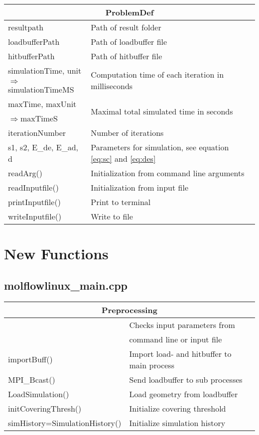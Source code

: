 \begin{center}
\begin{tabular}{|l|l|}
\hline
\multicolumn{2}{|c|}{\rule{0pt}{3ex}ProblemDef}\\
\hline
\rule{0pt}{3ex} resultpath& Path of result folder\\
\rule{0pt}{3ex} loadbufferPath& Path of loadbuffer file\\
\rule{0pt}{3ex} hitbufferPath& Path of hitbuffer file\\
\rule{0pt}{3ex} simulationTime, unit& \multirow{2}{*}{Computation time of each iteration in milliseconds}\\
\quad$\Rightarrow$simulationTimeMS&\\
\rule{0pt}{3ex} maxTime, maxUnit& \multirow{2}{*}{Maximal total simulated time in seconds}\\
\quad$\Rightarrow$maxTimeS&\\
\rule{0pt}{3ex} iterationNumber& Number of iterations\\
\rule{0pt}{3ex} s1, s2, E\_de, E\_ad, d& Parameters for simulation, see equation \ref{eq:sc} and \ref{eq:des}\\
\hline
\rule{0pt}{3ex} readArg()& Initialization from command line arguments\\
\rule{0pt}{3ex} readInputfile()& Initialization from input file\\
\rule{0pt}{3ex} printInputfile()& Print to terminal\\
\rule{0pt}{3ex} writeInputfile()& Write to file\\
\hline
\end{tabular}
\end{center}

\section{New Functions}
\subsection{molflowlinux\_main.cpp}
\begin{center}
\begin{tabular}{|l|l|}
\hline
\multicolumn{2}{|c|}{\rule{0pt}{3ex}Preprocessing}\\
\hline
\rule{0pt}{3ex} \multirow{2}{*}{parametercheck()}& Checks input parameters from\\&command line or input file\\
\rule{0pt}{3ex} importBuff()& Import load- and hitbuffer to main process\\
\rule{0pt}{3ex} MPI\_Bcast()& Send loadbuffer to sub processes\\
\rule{0pt}{3ex} LoadSimulation()& Load geometry from loadbuffer\\
\rule{0pt}{3ex} initCoveringThresh()& Initialize covering threshold\\
\rule{0pt}{3ex} simHistory=SimulationHistory()& Initialize simulation history\\
\hline
\end{tabular}
\end{center}

